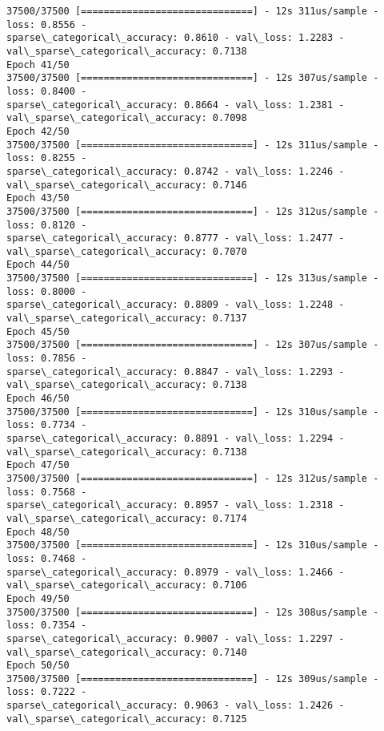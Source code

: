 \documentclass[11pt]{article}
\begin{document}
\begin{Verbatim}[commandchars=\\\{\}]
37500/37500 [==============================] - 12s 311us/sample - loss: 0.8556 -
sparse\_categorical\_accuracy: 0.8610 - val\_loss: 1.2283 -
val\_sparse\_categorical\_accuracy: 0.7138
Epoch 41/50
37500/37500 [==============================] - 12s 307us/sample - loss: 0.8400 -
sparse\_categorical\_accuracy: 0.8664 - val\_loss: 1.2381 -
val\_sparse\_categorical\_accuracy: 0.7098
Epoch 42/50
37500/37500 [==============================] - 12s 311us/sample - loss: 0.8255 -
sparse\_categorical\_accuracy: 0.8742 - val\_loss: 1.2246 -
val\_sparse\_categorical\_accuracy: 0.7146
Epoch 43/50
37500/37500 [==============================] - 12s 312us/sample - loss: 0.8120 -
sparse\_categorical\_accuracy: 0.8777 - val\_loss: 1.2477 -
val\_sparse\_categorical\_accuracy: 0.7070
Epoch 44/50
37500/37500 [==============================] - 12s 313us/sample - loss: 0.8000 -
sparse\_categorical\_accuracy: 0.8809 - val\_loss: 1.2248 -
val\_sparse\_categorical\_accuracy: 0.7137
Epoch 45/50
37500/37500 [==============================] - 12s 307us/sample - loss: 0.7856 -
sparse\_categorical\_accuracy: 0.8847 - val\_loss: 1.2293 -
val\_sparse\_categorical\_accuracy: 0.7138
Epoch 46/50
37500/37500 [==============================] - 12s 310us/sample - loss: 0.7734 -
sparse\_categorical\_accuracy: 0.8891 - val\_loss: 1.2294 -
val\_sparse\_categorical\_accuracy: 0.7138
Epoch 47/50
37500/37500 [==============================] - 12s 312us/sample - loss: 0.7568 -
sparse\_categorical\_accuracy: 0.8957 - val\_loss: 1.2318 -
val\_sparse\_categorical\_accuracy: 0.7174
Epoch 48/50
37500/37500 [==============================] - 12s 310us/sample - loss: 0.7468 -
sparse\_categorical\_accuracy: 0.8979 - val\_loss: 1.2466 -
val\_sparse\_categorical\_accuracy: 0.7106
Epoch 49/50
37500/37500 [==============================] - 12s 308us/sample - loss: 0.7354 -
sparse\_categorical\_accuracy: 0.9007 - val\_loss: 1.2297 -
val\_sparse\_categorical\_accuracy: 0.7140
Epoch 50/50
37500/37500 [==============================] - 12s 309us/sample - loss: 0.7222 -
sparse\_categorical\_accuracy: 0.9063 - val\_loss: 1.2426 -
val\_sparse\_categorical\_accuracy: 0.7125
    \end{Verbatim}
\end{document}
